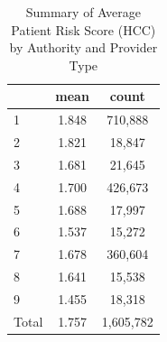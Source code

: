 \begin{table}[htbp]\centering
\def\sym#1{\ifmmode^{#1}\else\(^{#1}\)\fi}
\caption{Summary of Average Patient Risk Score (HCC) by Authority and Provider Type}
\begin{tabular}{l*{1}{cc}}
\toprule
                    &        mean&       count\\
\midrule
1                   &       1.848&     710,888\\
2                   &       1.821&      18,847\\
3                   &       1.681&      21,645\\
4                   &       1.700&     426,673\\
5                   &       1.688&      17,997\\
6                   &       1.537&      15,272\\
7                   &       1.678&     360,604\\
8                   &       1.641&      15,538\\
9                   &       1.455&      18,318\\
Total               &       1.757&   1,605,782\\
\bottomrule
\end{tabular}
\end{table}
